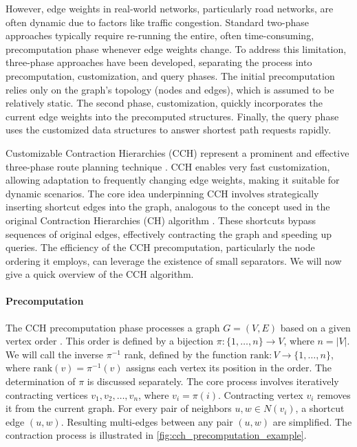 However, edge weights in real-world networks, particularly road networks, are often dynamic due to factors like traffic congestion.
Standard two-phase approaches typically require re-running the entire, often time-consuming, precomputation phase whenever edge weights change.
To address this limitation, three-phase approaches have been developed, separating the process into precomputation, customization, and query phases.
The initial precomputation relies only on the graph's topology (nodes and edges), which is assumed to be relatively static.
The second phase, customization, quickly incorporates the current edge weights into the precomputed structures.
Finally, the query phase uses the customized data structures to answer shortest path requests rapidly.

Customizable Contraction Hierarchies (CCH) represent a prominent and effective three-phase route planning technique \cite{dibbelt_customizable_2016}.
CCH enables very fast customization, allowing adaptation to frequently changing edge weights, making it suitable for dynamic scenarios.
The core idea underpinning CCH involves strategically inserting shortcut edges into the graph, analogous to the concept used in the original Contraction Hierarchies (CH) algorithm \cite{mcgeoch_contraction_2008}.
These shortcuts bypass sequences of original edges, effectively contracting the graph and speeding up queries.
The efficiency of the CCH precomputation, particularly the node ordering it employs, can leverage the existence of small separators.
We will now give a quick overview of the CCH algorithm.

\paragraph{Precomputation}

The CCH precomputation phase processes a graph \( G = (V, E) \) based on a given vertex order \cite{dibbelt_customizable_2016}.
This order is defined by a bijection \( \pi : \{1, \dots, n\} \to V \), where \( n = |V| \).
We will call the inverse \( \pi^{-1} \) rank, defined by the function \( \text{rank} : V \to \{1, \dots, n\} \), where \( \text{rank}(v) = \pi^{-1}(v) \) assigns each vertex its position in the order.
The determination of \( \pi \) is discussed separately.
The core process involves iteratively contracting vertices \( v_1, v_2, \dots, v_n \), where \( v_i = \pi(i) \).
Contracting vertex \( v_i \) removes it from the current graph.
For every pair of neighbors \( u, w \in N(v_i) \), a shortcut edge \( (u, w) \).
Resulting multi-edges between any pair \( (u, w) \) are simplified.
The contraction process is illustrated in \cref{fig:cch_precomputation_example}.

